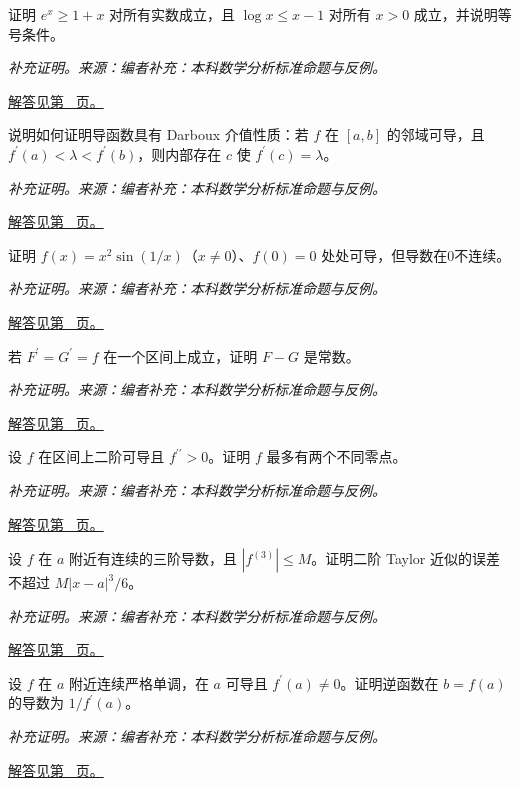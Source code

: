 \documentclass[12pt,fontset=fandol]{ctexart}
\begin{document}
\begin{example}[指数与对数的基本不等式]\label{ex:c7q14}
证明 $e^x\ge1+x$ 对所有实数成立，且 $\log x\le x-1$ 对所有 $x>0$ 成立，并说明等号条件。
\par\textit{补充证明。来源：编者补充：本科数学分析标准命题与反例。}\par\hyperref[ans:c7q14]{解答见第~\pageref{ans:c7q14} 页。}
\end{example}
\begin{example}[导函数的介值性]\label{ex:c7q15}
说明如何证明导函数具有 Darboux 介值性质：若 $f$ 在 $[a,b]$ 的邻域可导，且 $f^{\prime}(a)<\lambda<f^{\prime}(b)$，则内部存在 $c$ 使 $f^{\prime}(c)=\lambda$。
\par\textit{补充证明。来源：编者补充：本科数学分析标准命题与反例。}\par\hyperref[ans:c7q15]{解答见第~\pageref{ans:c7q15} 页。}
\end{example}
\begin{example}[导数不连续的可导函数]\label{ex:c7q16}
证明 $f(x)=x^2\sin(1/x)$（$x\ne0$）、$f(0)=0$ 处处可导，但导数在0不连续。
\par\textit{补充证明。来源：编者补充：本科数学分析标准命题与反例。}\par\hyperref[ans:c7q16]{解答见第~\pageref{ans:c7q16} 页。}
\end{example}
\begin{example}[两个原函数之差]\label{ex:c7q17}
若 $F^{\prime}=G^{\prime}=f$ 在一个区间上成立，证明 $F-G$ 是常数。
\par\textit{补充证明。来源：编者补充：本科数学分析标准命题与反例。}\par\hyperref[ans:c7q17]{解答见第~\pageref{ans:c7q17} 页。}
\end{example}
\begin{example}\label{ex:c7q18}
设 $f$ 在区间上二阶可导且 $f^{\prime\prime}>0$。证明 $f$ 最多有两个不同零点。
\par\textit{补充证明。来源：编者补充：本科数学分析标准命题与反例。}\par\hyperref[ans:c7q18]{解答见第~\pageref{ans:c7q18} 页。}
\end{example}
\begin{example}\label{ex:c7q19}
设 $f$ 在 $a$ 附近有连续的三阶导数，且 $|f^{(3)}|\le M$。证明二阶 Taylor 近似的误差不超过 $M|x-a|^3/6$。
\par\textit{补充证明。来源：编者补充：本科数学分析标准命题与反例。}\par\hyperref[ans:c7q19]{解答见第~\pageref{ans:c7q19} 页。}
\end{example}
\begin{example}[逆函数的导数条件]\label{ex:c7q20}
设 $f$ 在 $a$ 附近连续严格单调，在 $a$ 可导且 $f^{\prime}(a)\ne0$。证明逆函数在 $b=f(a)$ 的导数为 $1/f^{\prime}(a)$。
\par\textit{补充证明。来源：编者补充：本科数学分析标准命题与反例。}\par\hyperref[ans:c7q20]{解答见第~\pageref{ans:c7q20} 页。}
\end{example}
\end{document}
